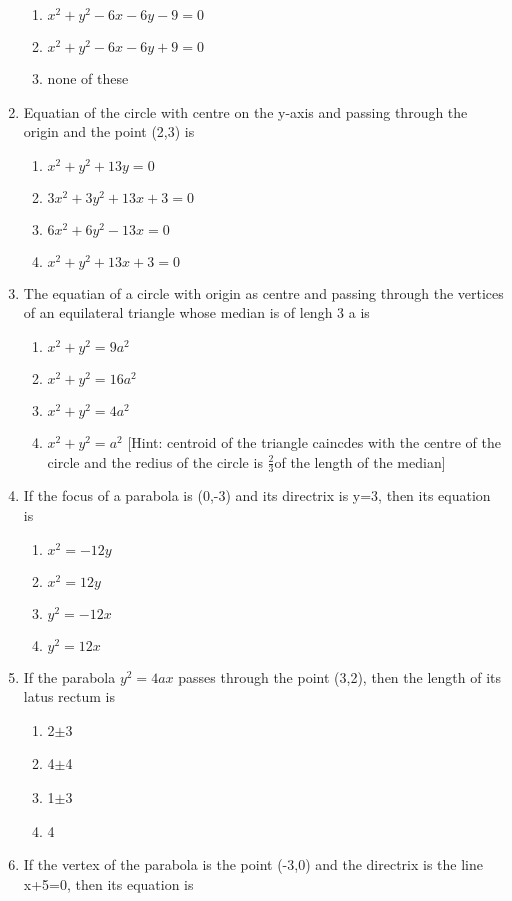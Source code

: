 \documentclass[12pt]{article}
\begin{document}
\begin{enumerate}
\begin{enumerate}
\item $x^2+y^2-6x-6y-9=0$
\item $x^2+y^2-6x-6y+9=0$
\item none of these
\end{enumerate}
\item Equatian of the circle with centre on the  y-axis and passing through the origin and the point (2,3) is  
\begin{enumerate}
\item $x^2+y^2+13y=0$
\item $3x^2+3y^2+13x+3=0$
\item $6x^2+6y^2-13x=0$
\item $x^2+y^2+13x+3=0$
\end{enumerate}
\item The equatian of a circle with origin as centre and passing through the vertices of an equilateral triangle whose median is of lengh 3 a is
\begin{enumerate}
\item $x^2+y^2=9a^2$
\item $x^2+y^2=16a^2$
\item $x^2+y^2=4a^2$
\item $x^2+y^2=a^2$
	[Hint: centroid of the triangle caincdes with the centre of the circle and the redius of the circle is $\frac{2}{3}$of the length of the median]
\end{enumerate}
\item If the focus of a parabola is (0,-3) and its directrix is y=3, then its equation is
\begin{enumerate}
\item $x^2=-12y$
\item $x^2=12y$
\item $y^2=-12x$
\item $y^2=12x$
\end{enumerate}
\item If the parabola $y^2=4ax$ passes through the point (3,2), then the length of its latus rectum is
\begin{enumerate}
\item 2$\pm$3
\item 4$\pm$4
\item 1$\pm$3
\item 4
\end{enumerate}
\item If the vertex of the parabola is the point (-3,0) and the directrix is the line x+5=0, then its equation is
\begin{enumerate}

\end{enumerate}
\end{enumerate}
\end{document}
